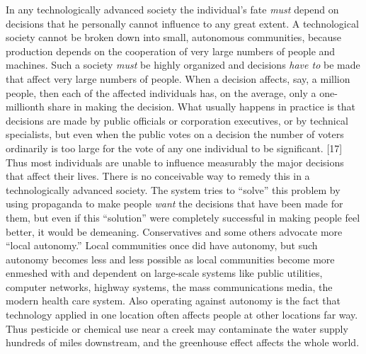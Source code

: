  In any technologically advanced society the individual’s fate {\em must} depend on decisions that he personally cannot influence to any great extent. A technological society cannot be broken down into small, autonomous communities, because production depends on the cooperation of very large numbers of people and machines. Such a society {\em must} be highly organized and decisions {\em have to} be made that affect very large numbers of people. When a decision affects, say, a million people, then each of the affected individuals has, on the average, only a one-millionth share in making the decision. What usually happens in practice is that decisions are made by public officials or corporation executives, or by technical specialists, but even when the public votes on a decision the number of voters ordinarily is too large for the vote of any one individual to be significant. [17] Thus most individuals are unable to influence measurably the major decisions that affect their lives. There is no conceivable way to remedy this in a technologically advanced society. The system tries to “solve” this problem by using propaganda to make people {\em want} the decisions that have been made for them, but even if this “solution” were completely successful in making people feel better, it would be demeaning.\break
{} Conservatives and some others advocate more “local autonomy.” Local communities once did have autonomy, but such autonomy becomes less and less possible as local communities become more enmeshed with and dependent on large-scale systems like public utilities, computer networks, highway systems, the mass communications media, the modern health care system. Also operating against autonomy is the fact that technology applied in one location often affects people at other locations far way. Thus pesticide or chemical use near a creek may contaminate the water supply hundreds of miles downstream, and the greenhouse effect affects the whole world.
